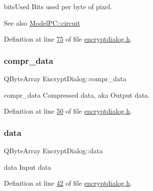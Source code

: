 bits\+Used Bits used per byte of pixel. 

\begin{DoxySeeAlso}{See also}
\mbox{\hyperlink{class_model_p_c_a1d0091062a0c836b283ec2f67411623b}{Model\+P\+C\+::circuit}} 
\end{DoxySeeAlso}


Definition at line \mbox{\hyperlink{encryptdialog_8h_source_l00075}{75}} of file \mbox{\hyperlink{encryptdialog_8h_source}{encryptdialog.\+h}}.

\mbox{\label{class_encrypt_dialog_a3e8998aa39696cbd1242f6420ef18143}} 
\subsubsection{\texorpdfstring{compr\+\_\+data}{compr\_data}}
{\footnotesize\ttfamily Q\+Byte\+Array Encrypt\+Dialog\+::compr\+\_\+data}



compr\+\_\+data Compressed data, aka Output data. 



Definition at line \mbox{\hyperlink{encryptdialog_8h_source_l00050}{50}} of file \mbox{\hyperlink{encryptdialog_8h_source}{encryptdialog.\+h}}.

\mbox{\label{class_encrypt_dialog_acf3a8bbce90d99ef17fec093c35b1008}} 
\subsubsection{\texorpdfstring{data}{data}}
{\footnotesize\ttfamily Q\+Byte\+Array Encrypt\+Dialog\+::data}



data Input data 



Definition at line \mbox{\hyperlink{encryptdialog_8h_source_l00042}{42}} of file \mbox{\hyperlink{encryptdialog_8h_source}{encryptdialog.\+h}}.

\mbox{\label{class_encrypt_dialog_a0c821b893cfddd7a6c07bbd270ba49e9}} 
